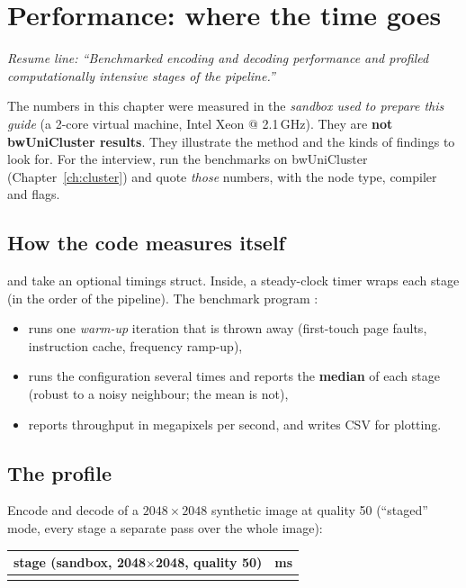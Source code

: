 \chapter{Performance: where the time goes}\label{ch:perf}

\emph{Resume line: ``Benchmarked encoding and decoding performance and profiled computationally intensive stages of the pipeline.''}

\begin{warn}
The numbers in this chapter were measured in the \emph{sandbox used to prepare this guide} (a 2-core virtual machine, Intel Xeon @ 2.1\,GHz). They are \textbf{not bwUniCluster results}. They illustrate the method and the kinds of findings to look for. For the interview, run the benchmarks on bwUniCluster (Chapter~\ref{ch:cluster}) and quote \emph{those} numbers, with the node type, compiler and flags.
\end{warn}

\section{How the code measures itself}

 and  take an optional timings struct. Inside, a steady-clock timer wraps each stage (in the order of the pipeline). The benchmark program :
\begin{itemize}
\item runs one \emph{warm-up} iteration that is thrown away (first-touch page faults, instruction cache, frequency ramp-up),
\item runs the configuration several times and reports the \textbf{median} of each stage (robust to a noisy neighbour; the mean is not),
\item reports throughput in megapixels per second, and writes CSV for plotting.
\end{itemize}

\section{The profile}

Encode and decode of a $2048\times2048$ synthetic image at quality 50 (``staged'' mode, every stage a separate pass over the whole image):

\begin{center}
\small
\begin{tabular}{@{}lr@{}}
\toprule
\textbf{stage (sandbox, 2048$\times$2048, quality 50)} & \textbf{ms}\\ \midrule
{}{snippets/sandbox_stages}
\end{tabular}
\end{center}

